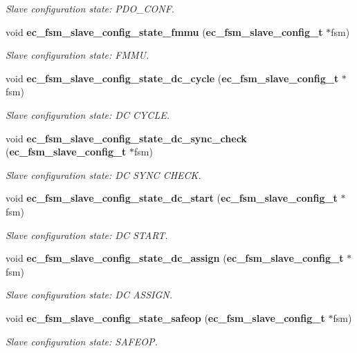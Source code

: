 \begin{DoxyCompactItemize}
\begin{DoxyCompactList}\small\item\em Slave configuration state\-: P\-D\-O\-\_\-\-C\-O\-N\-F. \end{DoxyCompactList}\item 
void {\bf ec\-\_\-fsm\-\_\-slave\-\_\-config\-\_\-state\-\_\-fmmu} ({\bf ec\-\_\-fsm\-\_\-slave\-\_\-config\-\_\-t} $\ast$fsm)
\begin{DoxyCompactList}\small\item\em Slave configuration state\-: F\-M\-M\-U. \end{DoxyCompactList}\item 
void {\bf ec\-\_\-fsm\-\_\-slave\-\_\-config\-\_\-state\-\_\-dc\-\_\-cycle} ({\bf ec\-\_\-fsm\-\_\-slave\-\_\-config\-\_\-t} $\ast$fsm)
\begin{DoxyCompactList}\small\item\em Slave configuration state\-: D\-C C\-Y\-C\-L\-E. \end{DoxyCompactList}\item 
void {\bf ec\-\_\-fsm\-\_\-slave\-\_\-config\-\_\-state\-\_\-dc\-\_\-sync\-\_\-check} ({\bf ec\-\_\-fsm\-\_\-slave\-\_\-config\-\_\-t} $\ast$fsm)
\begin{DoxyCompactList}\small\item\em Slave configuration state\-: D\-C S\-Y\-N\-C C\-H\-E\-C\-K. \end{DoxyCompactList}\item 
void {\bf ec\-\_\-fsm\-\_\-slave\-\_\-config\-\_\-state\-\_\-dc\-\_\-start} ({\bf ec\-\_\-fsm\-\_\-slave\-\_\-config\-\_\-t} $\ast$fsm)
\begin{DoxyCompactList}\small\item\em Slave configuration state\-: D\-C S\-T\-A\-R\-T. \end{DoxyCompactList}\item 
void {\bf ec\-\_\-fsm\-\_\-slave\-\_\-config\-\_\-state\-\_\-dc\-\_\-assign} ({\bf ec\-\_\-fsm\-\_\-slave\-\_\-config\-\_\-t} $\ast$fsm)
\begin{DoxyCompactList}\small\item\em Slave configuration state\-: D\-C A\-S\-S\-I\-G\-N. \end{DoxyCompactList}\item 
void {\bf ec\-\_\-fsm\-\_\-slave\-\_\-config\-\_\-state\-\_\-safeop} ({\bf ec\-\_\-fsm\-\_\-slave\-\_\-config\-\_\-t} $\ast$fsm)
\begin{DoxyCompactList}\small\item\em Slave configuration state\-: S\-A\-F\-E\-O\-P. \end{DoxyCompactList}\item 

\end{DoxyCompactItemize}
